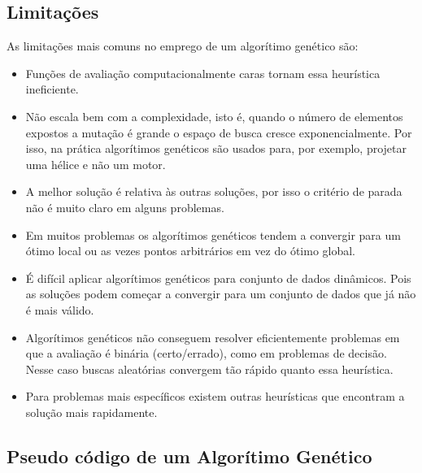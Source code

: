 \subsection{Limitações}

As limitações mais comuns no emprego de um algorítimo genético são:

\begin{itemize}
\item
  Funções de avaliação computacionalmente caras tornam essa heurística
  ineficiente.
\item
  Não escala bem com a complexidade, isto é, quando o número de
  elementos expostos a mutação é grande o espaço de busca cresce
  exponencialmente. Por isso, na prática algorítimos genéticos são
  usados para, por exemplo, projetar uma hélice e não um motor.
\item
  A melhor solução é relativa às outras soluções, por isso o critério de
  parada não é muito claro em alguns problemas.
\item
  Em muitos problemas os algorítimos genéticos tendem a convergir para
  um ótimo local ou as vezes pontos arbitrários em vez do ótimo global.
\item
  É difícil aplicar algorítimos genéticos para conjunto de dados
  dinâmicos. Pois as soluções podem começar a convergir para um conjunto
  de dados que já não é mais válido.
\item
  Algorítimos genéticos não conseguem resolver eficientemente problemas
  em que a avaliação é binária (certo/errado), como em problemas de
  decisão. Nesse caso buscas aleatórias convergem tão rápido quanto essa
  heurística.
\item
  Para problemas mais específicos existem outras heurísticas que
  encontram a solução mais rapidamente.
\end{itemize}

\subsection{Pseudo código de um Algorítimo Genético}

